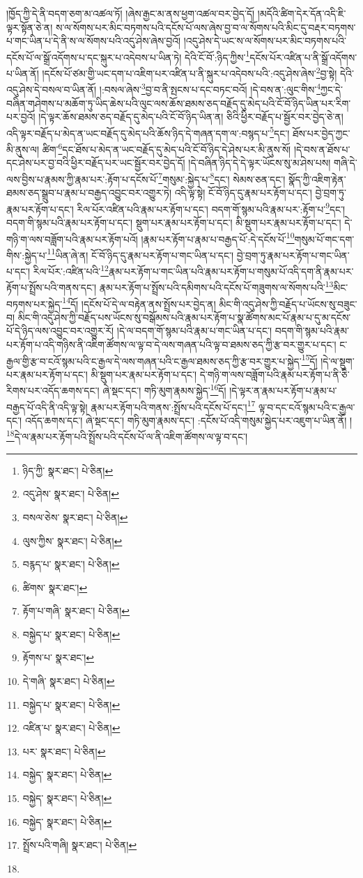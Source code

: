 །ཁྱོད་ཀྱི་དེ་ནི་བདག་ཅག་མ་འཚལ་ཏོ། །ཞེས་རྒྱང་མ་ནས་ཕྱག་འཚལ་བར་བྱེད་དོ། །མདོའི་ཚིག་དེར་དོན་འདི་ཇི་ལྟར་སྟོན་ཅེ་ན། ས་ལ་སོགས་པར་མིང་བཏགས་པའི་དངོས་པོ་ལས་ཞེས་བྱ་བ་ལ་སོགས་པའི་མིང་དུ་བརྡར་བཏགས་པ་གང་ཡིན་པ་དེ་ནི་ས་ལ་སོགས་པའི་འདུ་ཤེས་ཞེས་བྱའོ། །འདུ་ཤེས་དེ་ཡང་ས་ལ་སོགས་པར་མིང་བཏགས་པའི་དངོས་པོ་ལ་སྒྲོ་འདོགས་པ་དང་སྐུར་པ་འདེབས་པ་ཡིན་ཏེ། དེའི་ངོ་བོ་:ཉིད་ཀྱིས་\footnote{ཉིད་ཀྱི་  སྣར་ཐང་།  པེ་ཅིན། }དངོས་པོར་འཛིན་པ་ནི་སྒྲོ་འདོགས་པ་ཡིན་ནོ། །དངོས་པོ་ཙམ་གྱི་ཡང་དག་པ་འཇིག་པར་འཛིན་པ་ནི་སྐུར་པ་འདེབས་པའི་:འདུ་ཤེས་ཞེས་\footnote{འདུ་ཤེས་  སྣར་ཐང་།  པེ་ཅིན། }བྱ་སྟེ། དེའི་འདུ་ཤེས་དེ་བསལ་བ་ཡིན་ནོ། །:བསལ་ཞེས་\footnote{བསལ་ཅེས་  སྣར་ཐང་།  པེ་ཅིན། }བྱ་བ་ནི་སྤངས་པ་དང་བཏང་བའོ། །དེ་བས་ན་:ལུང་གིས་\footnote{ལུས་ཀྱིས་  སྣར་ཐང་།  པེ་ཅིན། }ཀྱང་དེ་བཞིན་གཤེགས་པ་མཆོག་ཏུ་ཡིད་ཆེས་པའི་ལུང་ལས་ཆོས་ཐམས་ཅད་བརྗོད་དུ་མེད་པའི་ངོ་བོ་ཉིད་ཡིན་པར་རིག་པར་བྱའོ། །དེ་ལྟར་ཆོས་ཐམས་ཅད་བརྗོད་དུ་མེད་པའི་ངོ་བོ་ཉིད་ཡིན་ན། ཅིའི་ཕྱིར་བརྗོད་པ་སྦྱོར་བར་བྱེད་ཅེ་ན། འདི་ལྟར་བརྗོད་པ་མེད་ན་ཡང་བརྗོད་དུ་མེད་པའི་ཆོས་ཉིད་དེ་གཞན་དག་ལ་:བསྙད་པ་\footnote{བརྙད་པ་  སྣར་ཐང་།  པེ་ཅིན། }དང་། ཐོས་པར་བྱེད་ཀྱང་མི་ནུས་ལ། ཚིག་\footnote{ཚིགས་  སྣར་ཐང་། }དང་ཐོས་པ་མེད་ན་ཡང་བརྗོད་དུ་མེད་པའི་ངོ་བོ་ཉིད་དེ་ཤེས་པར་མི་ནུས་སོ། །དེ་བས་ན་ཐོས་པ་དང་ཤེས་པར་བྱ་བའི་ཕྱིར་བརྗོད་པར་ཡང་སྦྱོར་བར་བྱེད་དོ། །དེ་བཞིན་ཉིད་དེ་དེ་ལྟར་ཡོངས་སུ་མ་ཤེས་པས། གཞི་དེ་ལས་བྱིས་པ་རྣམས་ཀྱི་རྣམ་པར་:རྟོག་པ་དངོས་པོ་\footnote{རྟོག་པ་གཞི་  སྣར་ཐང་།  པེ་ཅིན། }གསུམ་:སྐྱེད་པ་\footnote{བསྐྱེད་པ་  སྣར་ཐང་།  པེ་ཅིན། }དང་། སེམས་ཅན་དང་། སྣོད་ཀྱི་འཇིག་རྟེན་ཐམས་ཅད་སྒྲུབ་པ་རྣམ་པ་བརྒྱད་འབྱུང་བར་འགྱུར་ཏེ། འདི་ལྟ་སྟེ། ངོ་བོ་ཉིད་དུ་རྣམ་པར་རྟོག་པ་དང་། བྱེ་བྲག་ཏུ་རྣམ་པར་རྟོག་པ་དང་། རིལ་པོར་འཛིན་པའི་རྣམ་པར་རྟོག་པ་དང་། བདག་གོ་སྙམ་པའི་རྣམ་པར་:རྟོག་པ་\footnote{རྟོགས་པ་  སྣར་ཐང་། }དང་། བདག་གི་སྙམ་པའི་རྣམ་པར་རྟོག་པ་དང་། སྡུག་པར་རྣམ་པར་རྟོག་པ་དང་། མི་སྡུག་པར་རྣམ་པར་རྟོག་པ་དང་། དེ་གཉི་ག་ལས་བཟློག་པའི་རྣམ་པར་རྟོག་པའོ། །རྣམ་པར་རྟོག་པ་རྣམ་པ་བརྒྱད་པོ་:དེ་དངོས་པོ་\footnote{དེ་གཞི་  སྣར་ཐང་།  པེ་ཅིན། }གསུམ་པོ་གང་དག་གིས་:སྐྱེད་པ་\footnote{བསྐྱེད་པ་  སྣར་ཐང་།  པེ་ཅིན། }ཡིན་ཞེ་ན། ངོ་བོ་ཉིད་དུ་རྣམ་པར་རྟོག་པ་གང་ཡིན་པ་དང་། བྱེ་བྲག་ཏུ་རྣམ་པར་རྟོག་པ་གང་ཡིན་པ་དང་། རིལ་པོར་:འཛིན་པའི་\footnote{འཛིན་པ་  སྣར་ཐང་།  པེ་ཅིན། }རྣམ་པར་རྟོག་པ་གང་ཡིན་པའི་རྣམ་པར་རྟོག་པ་གསུམ་པོ་འདི་དག་ནི་རྣམ་པར་རྟོག་པ་སྤྲོས་པའི་གནས་དང་། རྣམ་པར་རྟོག་པ་སྤྲོས་པའི་དམིགས་པའི་དངོས་པོ་གཟུགས་ལ་སོགས་པའི་\footnote{པར་  སྣར་ཐང་།  པེ་ཅིན། }མིང་བཏགས་པར་སྐྱེད་\footnote{བསྐྱེད་  སྣར་ཐང་།  པེ་ཅིན། }དོ། །དངོས་པོ་དེ་ལ་བརྟེན་ནས་སྤྲོས་པར་བྱེད་ན། མིང་གི་འདུ་ཤེས་ཀྱི་བརྗོད་པ་ཡོངས་སུ་བཟུང་བ། མིང་གི་འདུ་ཤེས་ཀྱི་བརྗོད་པས་ཡོངས་སུ་བསྒོམས་པའི་རྣམ་པར་རྟོག་པ་སྣ་ཚོགས་མང་པོ་རྣམ་པ་དུ་མ་དངོས་པོ་དེ་ཉིད་ལས་འབྱུང་བར་འགྱུར་རོ། །དེ་ལ་བདག་གོ་སྙམ་པའི་རྣམ་པ་གང་ཡིན་པ་དང་། བདག་གི་སྙམ་པའི་རྣམ་པར་རྟོག་པ་འདི་གཉིས་ནི་འཇིག་ཚོགས་ལ་ལྟ་བ་དེ་ལས་གཞན་པའི་ལྟ་བ་ཐམས་ཅད་ཀྱི་རྩ་བར་གྱུར་པ་དང་། ང་རྒྱལ་གྱི་རྩ་བ་ངའོ་སྙམ་པའི་ང་རྒྱལ་དེ་ལས་གཞན་པའི་ང་རྒྱལ་ཐམས་ཅད་ཀྱི་རྩ་བར་གྱུར་པ་སྐྱེད་\footnote{བསྐྱེད་  སྣར་ཐང་།  པེ་ཅིན། }དོ། །དེ་ལ་སྡུག་པར་རྣམ་པར་རྟོག་པ་དང་། མི་སྡུག་པར་རྣམ་པར་རྟོག་པ་དང་། དེ་གཉི་ག་ལས་བཟློག་པའི་རྣམ་པར་རྟོག་པ་ནི་ཅི་རིགས་པར་འདོད་ཆགས་དང་། ཞེ་སྡང་དང་། གཏི་མུག་རྣམས་སྐྱེད་\footnote{བསྐྱེད་  སྣར་ཐང་།  པེ་ཅིན། }དོ། །དེ་ལྟར་ན་རྣམ་པར་རྟོག་པ་རྣམ་པ་བརྒྱད་པོ་འདི་ནི་འདི་ལྟ་སྟེ། རྣམ་པར་རྟོག་པའི་གནས་:སྤྲོས་པའི་དངོས་པོ་དང་།\footnote{སྤྲོས་པའི་གཞི།  སྣར་ཐང་།  པེ་ཅིན། } ལྟ་བ་དང་ངའོ་སྙམ་པའི་ང་རྒྱལ་དང་། འདོད་ཆགས་དང་། ཞེ་སྡང་དང་། གཏི་མུག་རྣམས་དང་། :དངོས་པོ་འདི་གསུམ་སྐྱེད་པར་འཇུག་པ་ཡིན་ནོ། །\footnote{}དེ་ལ་རྣམ་པར་རྟོག་པའི་སྤྲོས་པའི་དངོས་པོ་ལ་ནི་འཇིག་ཚོགས་ལ་ལྟ་བ་དང་། 